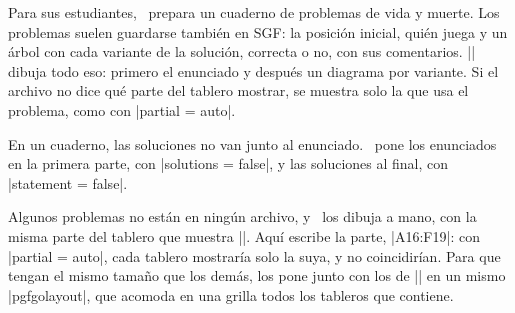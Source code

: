 \begin{goban}
Para sus estudiantes, \karu\ prepara un cuaderno de problemas de vida y muerte. Los problemas suelen guardarse también en SGF: la posición inicial, quién juega y un árbol con cada variante de la solución, correcta o no, con sus comentarios. |\sgfproblem| dibuja todo eso: primero el enunciado y después un diagrama por variante. Si el archivo no dice qué parte del tablero mostrar, se muestra solo la que usa el problema, como con |partial = auto|.

\begin{codeexample}

\end{codeexample}


En un cuaderno, las soluciones no van junto al enunciado. \karu\ pone los enunciados en la primera parte, con |solutions = false|, y las soluciones al final, con |statement = false|.

\begin{codeexample}
\end{codeexample}



Algunos problemas no están en ningún archivo, y \karu\ los dibuja a mano, con la misma parte del tablero que muestra |\sgfproblem|. Aquí escribe la parte, |A16:F19|: con |partial = auto|, cada tablero mostraría solo la suya, y no coincidirían. Para que tengan el mismo tamaño que los demás, los pone junto con los de |\sgfproblem| en un mismo |pgfgolayout|, que acomoda en una grilla todos los tableros que contiene.

\begin{codeexample}
	\begin{pgfgolayout}[columns = 3, fit]
		\begin{goban}[19, partial = A16:F19]
		\end{goban}
		\begin{goban}[19, partial = A16:F19]
		\end{goban}
	\end{pgfgolayout}
\end{codeexample}


\end{goban}
